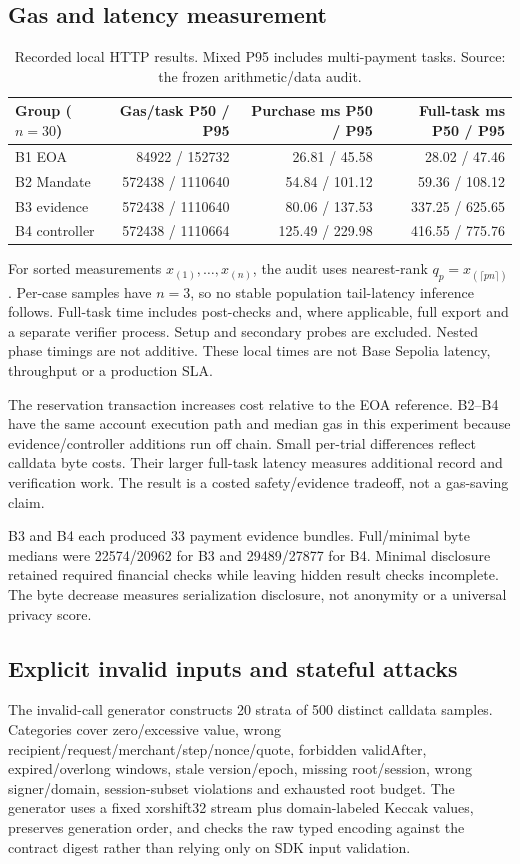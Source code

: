 \subsection{Gas and latency measurement}
\begin{table}[htbp]\centering\small
\begin{tabular}{lrrr}\toprule
Group ($n=30$) & Gas/task P50 / P95 & Purchase ms P50 / P95 & Full-task ms P50 / P95\\\midrule
B1 EOA & 84922 / 152732 & 26.81 / 45.58 & 28.02 / 47.46\\
B2 Mandate & 572438 / 1110640 & 54.84 / 101.12 & 59.36 / 108.12\\
B3 evidence & 572438 / 1110640 & 80.06 / 137.53 & 337.25 / 625.65\\
B4 controller & 572438 / 1110664 & 125.49 / 229.98 & 416.55 / 775.76\\\bottomrule
\end{tabular}\caption{Recorded local HTTP results. Mixed P95 includes multi-payment tasks. Source: the frozen arithmetic/data audit.}\label{tab:performance}\end{table}

For sorted measurements $x_{(1)},\ldots,x_{(n)}$, the audit uses nearest-rank $q_p=x_{(\lceil pn\rceil)}$. Per-case samples have $n=3$, so no stable population tail-latency inference follows. Full-task time includes post-checks and, where applicable, full export and a separate verifier process. Setup and secondary probes are excluded. Nested phase timings are not additive. These local times are not Base Sepolia latency, throughput or a production SLA.

The reservation transaction increases cost relative to the EOA reference. B2--B4 have the same account execution path and median gas in this experiment because evidence/controller additions run off chain. Small per-trial differences reflect calldata byte costs. Their larger full-task latency measures additional record and verification work. The result is a costed safety/evidence tradeoff, not a gas-saving claim.

B3 and B4 each produced 33 payment evidence bundles. Full/minimal byte medians were 22574/20962 for B3 and 29489/27877 for B4. Minimal disclosure retained required financial checks while leaving hidden result checks incomplete. The byte decrease measures serialization disclosure, not anonymity or a universal privacy score.

\subsection{Explicit invalid inputs and stateful attacks}
The invalid-call generator constructs 20 strata of 500 distinct calldata samples. Categories cover zero/excessive value, wrong recipient/request/merchant/step/nonce/quote, forbidden validAfter, expired/overlong windows, stale version/epoch, missing root/session, wrong signer/domain, session-subset violations and exhausted root budget. The generator uses a fixed xorshift32 stream plus domain-labeled Keccak values, preserves generation order, and checks the raw typed encoding against the contract digest rather than relying only on SDK input validation.

